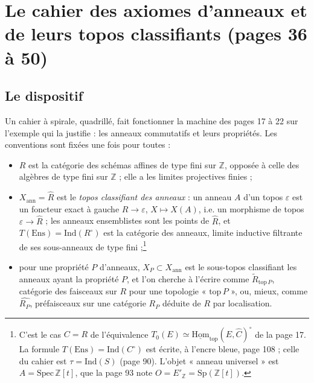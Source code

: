 \documentclass[11pt,a4paper]{article}
\begin{document}
\section*{Le cahier des axiomes d'anneaux et de leurs topos classifiants (pages 36 à 50)}

\subsection*{Le dispositif}

Un cahier à spirale, quadrillé, fait fonctionner la machine des pages 17 à
22 sur l'exemple qui la justifie : les anneaux commutatifs et leurs
propriétés. Les conventions sont fixées une fois pour toutes :
\begin{itemize}
\item $R$ est la catégorie des schémas affines de type fini sur
$\mathbb{Z}$, opposée à celle des algèbres de type fini sur $\mathbb{Z}$ ;
elle a les limites projectives finies ;
\item $X_{\mathrm{ann}} = \widehat{R}$ est le \emph{topos classifiant des
anneaux} : un anneau $A$ d'un topos $\varepsilon$ est un foncteur exact à
gauche $R \to \varepsilon$, $X \mapsto X(A)$, i.e. un morphisme de topos
$\varepsilon \to \widehat{R}$ ; les anneaux ensemblistes sont les points de
$\widehat{R}$, et $T(\mathrm{Ens}) = \mathrm{Ind}(R^{\circ})$ est la catégorie
des anneaux, limite inductive filtrante de ses sous-anneaux de type
fini ;\footnote{C'est le cas $C = R$ de l'équivalence $T_{0}(E) \simeq
\underline{\mathrm{Hom}}_{\mathrm{top}}(E, \widehat{C})^{\circ}$ de la page 17.
La formule $T(\mathrm{Ens}) = \mathrm{Ind}(C^{\circ})$ est écrite, à
l'encre bleue, page 108 ; celle du cahier est $\tau = \mathrm{Ind}(S)$
(page 90). L'objet « anneau universel » est $A = \mathrm{Spec}\,
\mathbb{Z}[t]$, que la page 93 note $O = E'_{\mathbb{Z}} = \mathrm{Sp}
(\mathbb{Z}[t])$.}
\item pour une propriété $P$ d'anneaux, $X_{P} \subset X_{\mathrm{ann}}$ est
le sous-topos classifiant les anneaux ayant la propriété $P$, et l'on
cherche à l'écrire comme $\widetilde{R}_{\mathrm{top}\,P}$, catégorie des
faisceaux sur $R$ pour une topologie « $\mathrm{top}\,P$ », ou, mieux,
comme $\widehat{R_{P}}$, préfaisceaux sur une catégorie $R_{P}$ déduite de
$R$ par localisation.
\end{itemize}
\end{document}
